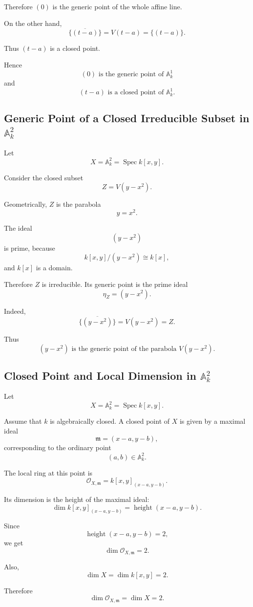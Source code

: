 \documentclass[12pt,a4paper]{article}
\theoremstyle{notespace}
\begin{document}
Therefore \((0)\) is the generic point of the whole affine line.

On the other hand,
\[
\overline{\{(t-a)\}}=V(t-a)=\{(t-a)\}.
\]

Thus \((t-a)\) is a closed point.

Hence
\[
\boxed{(0)\text{ is the generic point of }\mathbb A^1_k}
\]
and
\[
\boxed{(t-a)\text{ is a closed point of }\mathbb A^1_k.}
\]

\subsection{Generic Point of a Closed Irreducible Subset in \(\mathbb A^2_k\)}

Let
\[
X=\mathbb A^2_k=\operatorname{Spec} k[x,y].
\]

Consider the closed subset
\[
Z=V(y-x^2).
\]

Geometrically, \(Z\) is the parabola
\[
y=x^2.
\]

The ideal
\[
(y-x^2)
\]
is prime, because
\[
k[x,y]/(y-x^2)\cong k[x],
\]
and \(k[x]\) is a domain.

Therefore \(Z\) is irreducible. Its generic point is the prime ideal
\[
\eta_Z=(y-x^2).
\]

Indeed,
\[
\overline{\{(y-x^2)\}}=V(y-x^2)=Z.
\]

Thus
\[
\boxed{(y-x^2)\text{ is the generic point of the parabola }V(y-x^2).}
\]

\subsection{Closed Point and Local Dimension in \(\mathbb A^2_k\)}

Let
\[
X=\mathbb A^2_k=\operatorname{Spec} k[x,y].
\]

Assume that \(k\) is algebraically closed. A closed point of \(X\) is given by a maximal ideal
\[
\mathfrak m=(x-a,y-b),
\]
corresponding to the ordinary point
\[
(a,b)\in \mathbb A^2_k.
\]

The local ring at this point is
\[
\mathcal O_{X,\mathfrak m}=k[x,y]_{(x-a,y-b)}.
\]

Its dimension is the height of the maximal ideal:
\[
\dim k[x,y]_{(x-a,y-b)}
=
\operatorname{height}(x-a,y-b).
\]

Since
\[
\operatorname{height}(x-a,y-b)=2,
\]
we get
\[
\dim \mathcal O_{X,\mathfrak m}=2.
\]

Also,
\[
\dim X=\dim k[x,y]=2.
\]

Therefore
\[
\boxed{\dim \mathcal O_{X,\mathfrak m}=\dim X=2.}
\]
\end{document}

